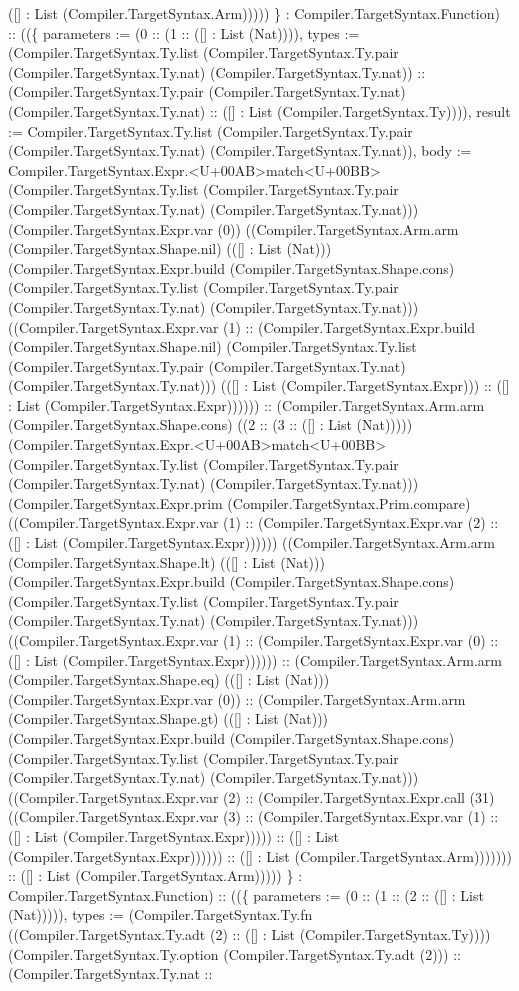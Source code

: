 \documentclass[11pt]{article}
\begin{document}
([] : List (Compiler.TargetSyntax.Arm))))) \} : Compiler.TargetSyntax.Function) :: ((\{ parameters := (0 :: (1 :: ([] : List (Nat)))), types := (Compiler.TargetSyntax.Ty.list (Compiler.TargetSyntax.Ty.pair (Compiler.TargetSyntax.Ty.nat) (Compiler.TargetSyntax.Ty.nat)) :: (Compiler.TargetSyntax.Ty.pair (Compiler.TargetSyntax.Ty.nat) (Compiler.TargetSyntax.Ty.nat) :: ([] : List (Compiler.TargetSyntax.Ty)))), result := Compiler.TargetSyntax.Ty.list (Compiler.TargetSyntax.Ty.pair (Compiler.TargetSyntax.Ty.nat) (Compiler.TargetSyntax.Ty.nat)), body := Compiler.TargetSyntax.Expr.<U+00AB>match<U+00BB> (Compiler.TargetSyntax.Ty.list (Compiler.TargetSyntax.Ty.pair (Compiler.TargetSyntax.Ty.nat) (Compiler.TargetSyntax.Ty.nat))) (Compiler.TargetSyntax.Expr.var (0)) ((Compiler.TargetSyntax.Arm.arm (Compiler.TargetSyntax.Shape.nil) (([] : List (Nat))) (Compiler.TargetSyntax.Expr.build (Compiler.TargetSyntax.Shape.cons) (Compiler.TargetSyntax.Ty.list (Compiler.TargetSyntax.Ty.pair (Compiler.TargetSyntax.Ty.nat) (Compiler.TargetSyntax.Ty.nat))) ((Compiler.TargetSyntax.Expr.var (1) :: (Compiler.TargetSyntax.Expr.build (Compiler.TargetSyntax.Shape.nil) (Compiler.TargetSyntax.Ty.list (Compiler.TargetSyntax.Ty.pair (Compiler.TargetSyntax.Ty.nat) (Compiler.TargetSyntax.Ty.nat))) (([] : List (Compiler.TargetSyntax.Expr))) :: ([] : List (Compiler.TargetSyntax.Expr)))))) :: (Compiler.TargetSyntax.Arm.arm (Compiler.TargetSyntax.Shape.cons) ((2 :: (3 :: ([] : List (Nat))))) (Compiler.TargetSyntax.Expr.<U+00AB>match<U+00BB> (Compiler.TargetSyntax.Ty.list (Compiler.TargetSyntax.Ty.pair (Compiler.TargetSyntax.Ty.nat) (Compiler.TargetSyntax.Ty.nat))) (Compiler.TargetSyntax.Expr.prim (Compiler.TargetSyntax.Prim.compare) ((Compiler.TargetSyntax.Expr.var (1) :: (Compiler.TargetSyntax.Expr.var (2) :: ([] : List (Compiler.TargetSyntax.Expr)))))) ((Compiler.TargetSyntax.Arm.arm (Compiler.TargetSyntax.Shape.lt) (([] : List (Nat))) (Compiler.TargetSyntax.Expr.build (Compiler.TargetSyntax.Shape.cons) (Compiler.TargetSyntax.Ty.list (Compiler.TargetSyntax.Ty.pair (Compiler.TargetSyntax.Ty.nat) (Compiler.TargetSyntax.Ty.nat))) ((Compiler.TargetSyntax.Expr.var (1) :: (Compiler.TargetSyntax.Expr.var (0) :: ([] : List (Compiler.TargetSyntax.Expr)))))) :: (Compiler.TargetSyntax.Arm.arm (Compiler.TargetSyntax.Shape.eq) (([] : List (Nat))) (Compiler.TargetSyntax.Expr.var (0)) :: (Compiler.TargetSyntax.Arm.arm (Compiler.TargetSyntax.Shape.gt) (([] : List (Nat))) (Compiler.TargetSyntax.Expr.build (Compiler.TargetSyntax.Shape.cons) (Compiler.TargetSyntax.Ty.list (Compiler.TargetSyntax.Ty.pair (Compiler.TargetSyntax.Ty.nat) (Compiler.TargetSyntax.Ty.nat))) ((Compiler.TargetSyntax.Expr.var (2) :: (Compiler.TargetSyntax.Expr.call (31) ((Compiler.TargetSyntax.Expr.var (3) :: (Compiler.TargetSyntax.Expr.var (1) :: ([] : List (Compiler.TargetSyntax.Expr))))) :: ([] : List (Compiler.TargetSyntax.Expr)))))) :: ([] : List (Compiler.TargetSyntax.Arm))))))) :: ([] : List (Compiler.TargetSyntax.Arm))))) \} : Compiler.TargetSyntax.Function) :: ((\{ parameters := (0 :: (1 :: (2 :: ([] : List (Nat))))), types := (Compiler.TargetSyntax.Ty.fn ((Compiler.TargetSyntax.Ty.adt (2) :: ([] : List (Compiler.TargetSyntax.Ty)))) (Compiler.TargetSyntax.Ty.option (Compiler.TargetSyntax.Ty.adt (2))) :: (Compiler.TargetSyntax.Ty.nat :: 
\end{document}
